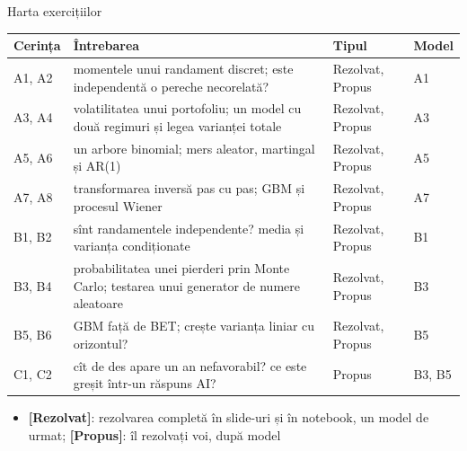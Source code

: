 \begin{frame}{Harta exercițiilor}
\itemsize{\small}
\begin{center}
\footnotesize
\begin{tabular}{>{\raggedright\arraybackslash}p{1.0cm}>{\raggedright\arraybackslash}p{7.6cm}>{\raggedright\arraybackslash}p{1.9cm}>{\raggedright\arraybackslash}p{1.4cm}}
\toprule
\textbf{Cerința} & \textbf{Întrebarea} & \textbf{Tipul} & \textbf{Model} \\
\midrule
A1, A2 & momentele unui randament discret; este independentă o pereche necorelată? & Rezolvat, Propus & A1 \\
A3, A4 & volatilitatea unui portofoliu; un model cu două regimuri și legea varianței totale & Rezolvat, Propus & A3 \\
A5, A6 & un arbore binomial; mers aleator, martingal și AR(1) & Rezolvat, Propus & A5 \\
A7, A8 & transformarea inversă pas cu pas; GBM și procesul Wiener & Rezolvat, Propus & A7 \\
B1, B2 & sînt randamentele independente? media și varianța condiționate & Rezolvat, Propus & B1 \\
B3, B4 & probabilitatea unei pierderi prin Monte Carlo; testarea unui generator de numere aleatoare & Rezolvat, Propus & B3 \\
B5, B6 & GBM față de BET; crește varianța liniar cu orizontul? & Rezolvat, Propus & B5 \\
C1, C2 & cît de des apare un an nefavorabil? ce este greșit într-un răspuns AI? & Propus & B3, B5 \\
\bottomrule
\end{tabular}
\end{center}
\begin{itemize}
    \item \textbf{[Rezolvat]}: rezolvarea completă în slide-uri și în notebook, un model de urmat; \textbf{[Propus]}: îl rezolvați voi, după model
\end{itemize}
\end{frame}

